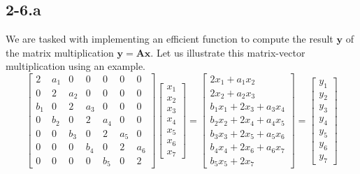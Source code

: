 \documentclass{article}
\begin{document}
\subsection*{2-6.a} We are tasked with implementing an efficient function to compute the result $\mathbf{y}$ of the matrix multiplication $\mathbf{y} = \mathbf{A}\mathbf{x}$. Let us illustrate this matrix-vector multiplication using an example.
\begin{equation*}
    \begin{bmatrix}
    2 & a_{1} & 0 & 0 & 0 & 0& 0 \\
    0 & 2 & a_{2} & 0 & 0& 0 & 0 \\
    b_{1} & 0 & 2 & a_{3} & 0 & 0& 0 \\
    0 & b_{2} & 0& 2& a_{4} & 0& 0\\
    0 & 0 &b_{3} & 0 & 2 & a_{5} & 0\\
    0 & 0 & 0 & b_{4} & 0 & 2 & a_{6} \\
    0  & 0 & 0 & 0 & b_{5} & 0 & 2
    \end{bmatrix}
    \begin{bmatrix}
        x_{1} \\ x_{2} \\ x_{3} \\ x_{4} \\ x_{5} \\ x_{6} \\ x_{7}
    \end{bmatrix} =
    \begin{bmatrix}
        2x_{1} + a_{1}x_{2} \\
        2x_{2} + a_{2}x_{3} \\
        b_{1}x_{1} + 2x_{3} + a_{3}x_{4} \\
        b_{2}x_{2} + 2x_{4} + a_{4}x_{5} \\
        b_{3}x_{3} + 2x_{5} + a_{5}x_{6} \\
        b_{4}x_{4} + 2x_{6} + a_{6}x_{7} \\
        b_{5}x_{5} + 2x_{7}
    \end{bmatrix} = \begin{bmatrix}
        y_{1} \\ y_{2}  \\ y_{3} \\ y_{4} \\ y_{5} \\ y_{6} \\ y_{7}
    \end{bmatrix}
\end{equation*}
\end{document}
